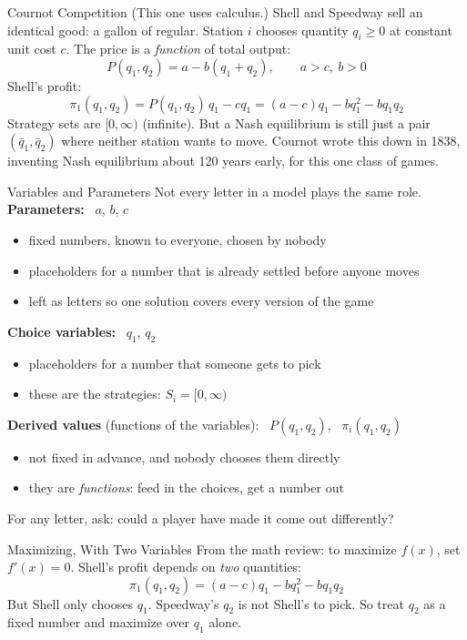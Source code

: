 \begin{frame}{Cournot Competition}
{\footnotesize (This one uses calculus.)}
\bsk
Shell and Speedway sell an identical good: a gallon of regular. Station $i$
chooses quantity $q_i\ge 0$ at constant unit cost $c$. The price is a \textit{function}
of total output:
$$P(q_1,q_2)=a-b(q_1+q_2),\qquad a>c,\ b>0$$
\bsk
Shell's profit:
$$\pi_1(q_1,q_2)=P(q_1,q_2)\,q_1-cq_1=(a-c)q_1-b q_1^2-b q_1 q_2$$
\bsk
Strategy sets are $[0,\infty)$ (infinite). But a Nash equilibrium is still just a
pair $(\bar q_1,\bar q_2)$ where neither station wants to move.
\vfill
{\footnotesize Cournot wrote this down in 1838, inventing Nash equilibrium about
120 years early, for this one class of games.}
\vspace{-0.3in}
\end{frame}

\begin{frame}{Variables and Parameters}
Not every letter in a model plays the same role.
\bsk
\textbf{Parameters:} \ $a$, $b$, $c$
\begin{itemize}
    \item fixed numbers, known to everyone, chosen by nobody
    \item placeholders for a number that is already settled before anyone moves
    \item left as letters so one solution covers every version of the game
\end{itemize}
\bsk
\textbf{Choice variables:} \ $q_1$, $q_2$
\begin{itemize}
    \item placeholders for a number that someone gets to pick
    \item these are the strategies: $S_i=[0,\infty)$
\end{itemize}
\bsk
\textbf{Derived values} (functions of the variables): \ $P(q_1,q_2)$, \ $\pi_i(q_1,q_2)$
\begin{itemize}
    \item not fixed in advance, and nobody chooses them directly
    \item they are \textit{functions}: feed in the choices, get a number out
\end{itemize}
\vfill
For any letter, ask: could a player have made it come out differently? \vspace{0.3in}
\end{frame}

\begin{frame}{Maximizing, With Two Variables}
From the math review: to maximize $f(x)$, set $f'(x)=0$.
\bsk
Shell's profit depends on \textit{two} quantities:
$$\pi_1(q_1,q_2)=(a-c)q_1-bq_1^2-bq_1q_2$$
\bsk
But Shell only chooses $q_1$. Speedway's $q_2$ is not Shell's to pick.
\vfill
So treat $q_2$ as a fixed number and maximize over $q_1$ alone. \vspace{0.8in}
\end{frame}

